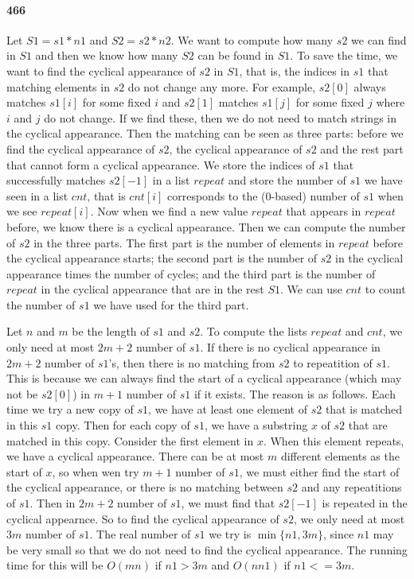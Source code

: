 \documentclass[11pt]{article}
\begin{document}
\begin{itemize}
\paragraph{466}
Let $S1 = s1 * n1$ and $S2 = s2 * n2$. We want to compute how many $s2$ we can find in $S1$ and then we know how many $S2$ can 
be found in $S1$. To save the time, we want to find the cyclical appearance of $s2$ in $S1$, that is, the indices in $s1$ that 
matching elements in $s2$ do not change any more. For example, $s2[0]$ always matches $s1[i]$ for some fixed $i$ and $s2[1]$ 
matches $s1[j]$ for some fixed $j$ where $i$ and $j$ do not change.
If we find these, then we do not need to match strings in the cyclical appearance. Then the matching can be seen as three parts:
before we find the cyclical appearance of $s2$, the cyclical appearance of $s2$ and the rest part that cannot form a cyclical 
appearance. 
We store the indices of $s1$ that successfully matches $s2[-1]$ in a list $repeat$ and store the number of $s1$ we have seen in 
a list $cnt$, that is $cnt[i]$ corresponds to the (0-based) number of $s1$ when we see $repeat[i]$. 
Now when we find a new value $repeat$ that appears in $repeat$ before, we know there is a cyclical appearance. 
Then we can compute the number of $s2$ in the three parts. The first part is the number of elements in $repeat$ before the 
cyclical appearance starts; the second part is the number of $s2$ in the cyclical appearance times the number of cycles; and 
the third part is the number of $repeat$ in the cyclical appearance that are in the rest $S1$. 
We can use $cnt$ to count the number of $s1$ we have used for the third part.

Let $n$ and $m$ be the length of $s1$ and $s2$. To compute the lists $repeat$ and $cnt$, we only need at most $2m+2$ number of 
$s1$. If there is no cyclical appearance in $2m+2$ number of $s1$'s, then there is no matching from $s2$ to repeatition of $s1$.
This is because we can always find the start of a cyclical appearance (which may not be $s2[0]$) in $m+1$ number of $s1$ if it 
exists. The reason is as follows.
Each time we try a new copy of $s1$, we have at least one element of $s2$ that is matched in this $s1$ copy.
Then for each copy of $s1$, we have a substring $x$ of $s2$ that are matched in this copy. 
Consider the first element in $x$. When this element repeats, we have a cyclical appearance.
There can be at most $m$ different elements as the start of $x$, so when wen try $m+1$ number of $s1$, we must either find the
start of the cyclical appearance, or there is no matching between $s2$ and any repeatitions of $s1$. 
Then in $2m+2$ number of $s1$, we must find that $s2[-1]$ is repeated in the cyclical appearnce.
So to find the cyclical appearance of $s2$, we only need at most $3m$ number of $s1$.
The real number of $s1$ we try is $\min \{ n1, 3m\}$, since $n1$ may be very small so that we do not need to find the cyclical 
appearance. 
The running time for this will be $O(mn)$ if $n1 > 3m$ and $O(nn1)$ if $n1 <= 3m$.


\end{itemize}
\end{document}

